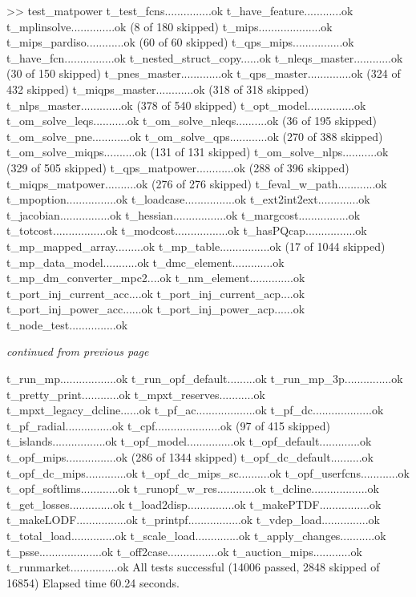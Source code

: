 \documentclass[12pt]{article}
\numberwithin{equation}{section}
\numberwithin{table}{section}
\numberwithin{figure}{section}
\begin{document}
\begin{enumerate}
\begin{Code}
>> test_matpower
t_test_fcns...............ok
t_have_feature............ok
t_mplinsolve..............ok (8 of 180 skipped)
t_mips....................ok
t_mips_pardiso............ok (60 of 60 skipped)
t_qps_mips................ok
t_have_fcn................ok
t_nested_struct_copy......ok
t_nleqs_master............ok (30 of 150 skipped)
t_pnes_master.............ok
t_qps_master..............ok (324 of 432 skipped)
t_miqps_master............ok (318 of 318 skipped)
t_nlps_master.............ok (378 of 540 skipped)
t_opt_model...............ok
t_om_solve_leqs...........ok
t_om_solve_nleqs..........ok (36 of 195 skipped)
t_om_solve_pne............ok
t_om_solve_qps............ok (270 of 388 skipped)
t_om_solve_miqps..........ok (131 of 131 skipped)
t_om_solve_nlps...........ok (329 of 505 skipped)
t_qps_matpower............ok (288 of 396 skipped)
t_miqps_matpower..........ok (276 of 276 skipped)
t_feval_w_path............ok
t_mpoption................ok
t_loadcase................ok
t_ext2int2ext.............ok
t_jacobian................ok
t_hessian.................ok
t_margcost................ok
t_totcost.................ok
t_modcost.................ok
t_hasPQcap................ok
t_mp_mapped_array.........ok
t_mp_table................ok (17 of 1044 skipped)
t_mp_data_model...........ok
t_dmc_element.............ok
t_mp_dm_converter_mpc2....ok
t_nm_element..............ok
t_port_inj_current_acc....ok
t_port_inj_current_acp....ok
t_port_inj_power_acc......ok
t_port_inj_power_acp......ok
t_node_test...............ok
\end{Code}
\emph{continued from previous page}
\begin{Code}
t_run_mp..................ok
t_run_opf_default.........ok
t_run_mp_3p...............ok
t_pretty_print............ok
t_mpxt_reserves...........ok
t_mpxt_legacy_dcline......ok
t_pf_ac...................ok
t_pf_dc...................ok
t_pf_radial...............ok
t_cpf.....................ok (97 of 415 skipped)
t_islands.................ok
t_opf_model...............ok
t_opf_default.............ok
t_opf_mips................ok (286 of 1344 skipped)
t_opf_dc_default..........ok
t_opf_dc_mips.............ok
t_opf_dc_mips_sc..........ok
t_opf_userfcns............ok
t_opf_softlims............ok
t_runopf_w_res............ok
t_dcline..................ok
t_get_losses..............ok
t_load2disp...............ok
t_makePTDF................ok
t_makeLODF................ok
t_printpf.................ok
t_vdep_load...............ok
t_total_load..............ok
t_scale_load..............ok
t_apply_changes...........ok
t_psse....................ok
t_off2case................ok
t_auction_mips............ok
t_runmarket...............ok
All tests successful (14006 passed, 2848 skipped of 16854)
Elapsed time 60.24 seconds.
\end{Code}
\end{enumerate}
\end{document}
